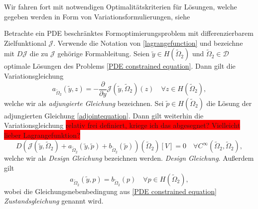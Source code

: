 Wir fahren fort mit notwendigen Optimalitätskriterien für Lösungen, welche gegeben werden in Form von Variationsformulierungen, siehe \cite{LagrangeNewton}

\begin{defi}
	Betrachte ein PDE beschränktes Formoptimierungsproblem mit differenzierbarem Zielfunktional $\mathcal{J}$. Verwende die Notation von \ref{lagrangefunction} und bezeichne mit $D\mathcal{J}$ die zu $\mathcal{J}$ gehörige Formableitung. Seien $\tilde{y} \in H(\tilde{\Omega}_2)$ und $\tilde{\Omega}_2\in \mathcal{D}$ optimale Lösungen des Problems \ref{PDE constrained equation}. Dann gilt die Variationsgleichung
\begin{equation}\label{adjointequation}
	a_{\tilde{\Omega}_2}(\tilde{y},z) = - \frac{\partial}{\partial y} \mathcal{J}(\tilde{y},\tilde{\Omega}_2)(z) \quad \forall z\in H(\tilde{\Omega}_2),
\end{equation}
welche wir als \textit{adjungierte Gleichung} bezeichnen. Sei $\tilde{p} \in H(\tilde{\Omega}_2)$ die Lösung der adjungierten Gleichung \ref{adjointequation}. Dann gilt weiterhin die Variationsgleichung
\colorbox{red}{ relativ frei definiert, kriege ich das abgesegnet? Vielleicht lieber Lagrangefunktion?}
\begin{equation}\label{Design equation}
	D\left(\mathcal{J}(\tilde{y},\tilde{\Omega}_2) + a_{\tilde{\Omega}_2}(\tilde{y},\tilde{p}) + b_{\tilde{\Omega}_2}(\tilde{p})\right)(\tilde{\Omega}_2)[V] = 0 \quad \forall C^\infty(\tilde{\Omega}_2,\tilde{\Omega}_2),
\end{equation}
welche wir als \textit{Design Gleichung} bezeichnen werden.
\textit{Design Gleichung}. Außerdem gilt
\begin{equation}
	a_{\tilde{\Omega}_2}(\tilde{y},p) = b_{\tilde{\Omega}_2}(p) \quad \forall p \in H(\tilde{\Omega}_2),
\end{equation}
wobei die Gleichungsnebenbedingung aus \ref{PDE constrained equation} \textit{Zustandsgleichung} genannt wird.
\end{defi}

